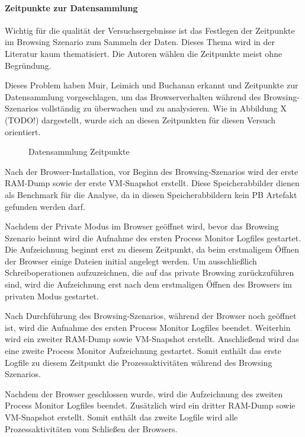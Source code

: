 \paragraph*{Zeitpunkte zur Datensammlung}
Wichtig für die qualität der Versuchsergebnisse ist das Festlegen der Zeitpunkte im Browsing Szenario zum Sammeln der Daten.
Dieses Thema wird in der Literatur kaum thematisiert. Die Autoren wählen die Zeitpunkte meist ohne Begründung.

Dieses Problem haben Muir, Leimich und Buchanan erkannt und Zeitpunkte zur Datensammlung vorgeschlagen, um das Browserverhalten während des Browsing-Szenarios vollständig zu überwachen und zu analysieren. Wie in Abbildung X (TODO!) dargestellt, wurde sich an diesen Zeitpunkten für diesen Versuch orientiert.
\begin{figure}[h!]
	\centering
	\small
	\centerline{\resizebox{\linewidth}{!}{}}
	\caption{Datensammlung Zeitpunkte}
	\label{fig:jes}
\end{figure}
Nach der Browser-Installation, vor Beginn des Browsing-Szenarios wird der erste RAM-Dump sowie der erste VM-Snapshot erstellt.
Diese Speicherabbilder dienen als Benchmark für die Analyse, da in diesen Speicherabbildern kein PB Artefakt gefunden werden darf.

Nachdem der Private Modus im Browser geöffnet wird, bevor das Browsing Szenario beinnt wird die Aufnahme des ersten Process Monitor Logfiles gestartet.
Die Aufzeichnung beginnt erst zu diesem Zeitpunkt, da beim erstmaligem Öffnen der Browser einige Dateien initial angelegt werden. Um ausschließlich Schreiboperationen aufzuzeichnen, die auf das private Browsing zurückzuführen sind, wird die Aufzeichnung erst nach dem erstmaligen Öffnen des Browsers im privaten Modus gestartet.

Nach Durchführung des Browsing-Szenarios, während der Browser noch geöffnet ist, wird die Aufnahme des ersten Process Monitor Logfiles beendet. Weiterhin wird ein zweiter RAM-Dump sowie VM-Snapshot erstellt. Anschließend wird das eine zweite Process Monitor Aufzeichnung gestartet. 
Somit enthält das erste Logfile zu diesem Zeitpunkt die Prozessaktivitäten während des Browsing Szenarios. 

Nachdem der Browser geschlossen wurde, wird die Aufzeichnung des zweiten Process Monitor Logfiles beendet. Zusätzlich wird ein dritter RAM-Dump sowie  VM-Snapshot erstellt. Somit enthält das zweite Logfile wird alle Prozessaktivitäten vom Schließen der Browsers.

